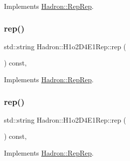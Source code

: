 Implements \mbox{\hyperlink{structHadron_1_1RepRep_ab3213025f6de249f7095892109575fde}{Hadron\+::\+Rep\+Rep}}.

\mbox{\label{structHadron_1_1H1o2D4E1Rep_a8657044b2491eb10846bc082432edb8e}} 
\subsubsection{\texorpdfstring{rep()}{rep()}\hspace{0.1cm}{\footnotesize\ttfamily [2/5]}}
{\footnotesize\ttfamily std\+::string Hadron\+::\+H1o2\+D4\+E1\+Rep\+::rep (\begin{DoxyParamCaption}{ }\end{DoxyParamCaption}) const\hspace{0.3cm}{\ttfamily [inline]}, {\ttfamily [virtual]}}



Implements \mbox{\hyperlink{structHadron_1_1RepRep_ab3213025f6de249f7095892109575fde}{Hadron\+::\+Rep\+Rep}}.

\mbox{\label{structHadron_1_1H1o2D4E1Rep_a8657044b2491eb10846bc082432edb8e}} 
\subsubsection{\texorpdfstring{rep()}{rep()}\hspace{0.1cm}{\footnotesize\ttfamily [3/5]}}
{\footnotesize\ttfamily std\+::string Hadron\+::\+H1o2\+D4\+E1\+Rep\+::rep (\begin{DoxyParamCaption}{ }\end{DoxyParamCaption}) const\hspace{0.3cm}{\ttfamily [inline]}, {\ttfamily [virtual]}}



Implements \mbox{\hyperlink{structHadron_1_1RepRep_ab3213025f6de249f7095892109575fde}{Hadron\+::\+Rep\+Rep}}.

\mbox{\label{structHadron_1_1H1o2D4E1Rep_a8657044b2491eb10846bc082432edb8e}} 
